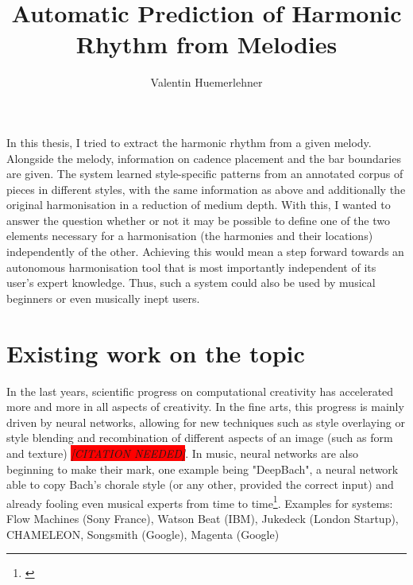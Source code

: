 \documentclass[a4paper,12pt]{report}
\title{Automatic Prediction of Harmonic Rhythm from Melodies}
\author{Valentin Huemerlehner}
\begin{document}
\beforepreface %

In this thesis, I tried to extract the harmonic rhythm from a given melody. Alongside the melody, information on cadence placement and the bar boundaries are given. The system learned style-specific patterns from an annotated corpus of pieces in different styles, with the same information as above and additionally the original harmonisation in a reduction of medium depth. With this, I wanted to answer the question whether or not it may be possible to define one of the two elements necessary for a harmonisation (the harmonies and their locations) independently of the other. Achieving this would mean a step forward towards an autonomous harmonisation tool that is most importantly independent of its user's expert knowledge. Thus, such a system could also be used by musical beginners or even musically inept users.



\afterpreface %
\newpage





\chapter{Existing work on the topic}
In the last years, scientific progress on computational creativity has accelerated more and more in all aspects of creativity. In the fine arts, this progress is mainly driven by neural networks, allowing for new techniques such as style overlaying or style blending and recombination of different aspects of an image (such as form and texture) \emph{\colorbox{red}{[CITATION NEEDED]}}. In music, neural networks are also beginning to make their mark, one example being "DeepBach", a neural network able to copy Bach's chorale style (or any other, provided the correct input) and already fooling even musical experts from time to time\footnote{\cite{hadjeres2016deepbach}}.
Examples for systems: Flow Machines (Sony France), Watson Beat (IBM), Jukedeck (London Startup), CHAMELEON, Songsmith (Google), Magenta (Google)
\end{document}
